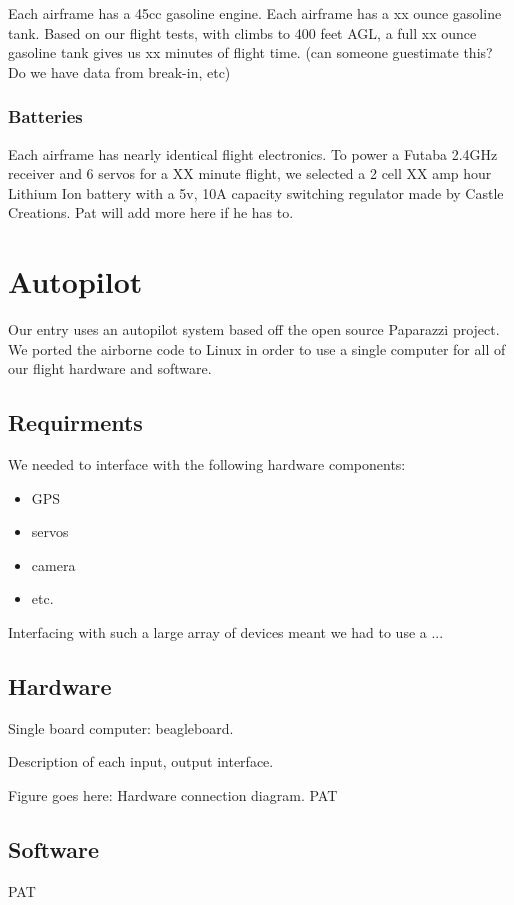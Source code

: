 \documentclass[10pt]{report}
\begin{document}
Each airframe has a 45cc gasoline engine. Each airframe has a xx ounce gasoline tank. Based on our flight tests, with climbs to 400 feet AGL, a full xx ounce gasoline tank gives us xx minutes of flight time. (can someone guestimate this? Do we have data from break-in, etc)

\subsubsection{Batteries}

Each airframe has nearly identical flight electronics. To power a Futaba 2.4GHz receiver and 6 servos for a XX minute flight, we selected a 2 cell XX amp hour Lithium Ion battery with a 5v, 10A capacity switching regulator made by Castle Creations. Pat will add more here if he has to.

\section{Autopilot}
Our entry uses an autopilot system based off the open source 
Paparazzi project\cite{paparazziweb}. 
We ported the airborne code to Linux in order to use a single computer for all of our flight hardware and software.

\subsection{Requirments}

We needed to interface with the following hardware components:
\begin{itemize}
	\setlength{\itemsep}{0cm}
	\setlength{\parskip}{0cm}
	\item GPS
	\item servos
	\item camera
	\item etc.
\end{itemize}

Interfacing with such a large array of devices meant we had to use a ...

\subsection{Hardware}
Single board computer: beagleboard.

Description of each input, output interface.

Figure goes here: Hardware connection diagram. PAT
\subsection{Software}
PAT
\end{document}
